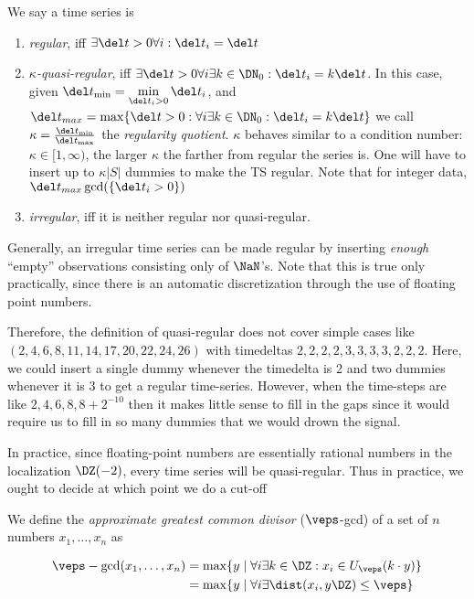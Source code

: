 \documentclass[a4paper,11pt,reqno]{scrartcl}
\begin{document}
%
\begin{definition}[]\label{def: label}
  We say a time series is

%
\begin{enumerate}%
  \item \emph{regular}, iff $\exists \del t>0 \forall i: \del t_i = \del t$ 
  \item \emph{$\kappa$-quasi-regular}, iff $\exists \del t>0 \forall i\exists k\in \DN_{0} : \del t_i = k\del t$. In this case, given  $\del t_{\min} =  \min\limits_{\del t_i > 0} \del t_i$, and $\del t_{max} = \max\{\del t>0 : \forall i\exists k\in \DN_{0} : \del t_i = k\del t\}$ we call $\kappa = \frac{\del t_{\min}}{\del t_{\max}}$ the \emph{regularity quotient}. $\kappa$ behaves similar to a condition number: $\kappa\in[1, \infty)$, the larger $\kappa$ the farther from regular the series is. One will have to insert up to $\kappa|S|$ dummies to make the TS regular. Note that for integer data, $\del t_{max} \gcd(\{\del t_i>0\})$
  \item \emph{irregular}, iff it is neither regular nor quasi-regular.
\end{enumerate}%

Generally, an irregular time series can be made regular by inserting \emph{enough} ``empty'' observations consisting only of $\NaN$'s. Note that this is true only practically, since there is an automatic discretization through the use of floating point numbers.

Therefore, the definition of quasi-regular does not cover simple cases like $(2,4,6,8,11,14,17,20,22,24,26)$ with timedeltas $2,2,2,2,3,3,3,3,2,2,2$. Here, we could insert a single dummy whenever the timedelta is 2 and two dummies whenever it is $3$ to get a regular time-series. However, when the time-steps are like $2,4,6,8, 8+2^{-10}$ then it makes little sense to fill in the gaps since it would require us to fill in so many dummies that we would drown the signal.


In practice, since floating-point numbers are essentially rational numbers in the localization $\DZ(-2)$, every time series will be quasi-regular. Thus in practice, we ought to decide at which point we do a cut-off

\end{definition}


%
\begin{definition}\label{def: label}
  We define the \emph{approximate greatest common divisor} ($\veps$-gcd) of a set of $n$ numbers $x_1, \ldots, x_n$ as

\begin{align}\label{eq: eps-gpd}
\veps-\gcd(x_1, \ldots, x_n) 
   &= \max\{ y \mid \forall i \exists k\in\DZ : x_i \in U_\veps(k\cdot y)\} 
\\ &= \max\{ y \mid \forall i \exists \dist(x_i, y\DZ)\le \veps \}
\end{align}

\end{definition}
\end{document}
